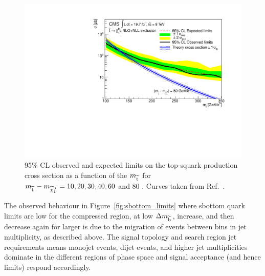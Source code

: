 \begin{figure}[!Hhtb]
\begin{center}
  \includegraphics[scale=0.39]{Figures/sus13009/limits//Limit80.pdf}
  \caption{95\% CL observed and expected limits on the top-squark production cross section as a function of the $m_{\widetilde{{\rm t}}\,}$ for $m_{\widetilde{{\rm t}}\,} - m_{\widetilde{\chi}^{0}_{1}\,} = 10, 20, 30, 40, 60$ and 80 \GeV. Curves taken from Ref.~\cite{sus13009}.}
  \label{fig:stop_limits}
  \end{center}
\end{figure}

The observed behaviour in Figure~\ref{fig:sbottom_limits} where sbottom quark limits are low for the compressed region, at low $\Delta m_{\widetilde{{\rm b}}\,}$, increase, and then decrease again for larger \dmsbot is due to the migration of events between bins in jet multiplicity, as described above. 
The signal topology and search region jet requirements means monojet events, dijet events, and higher jet multiplicities dominate in the different regions of phase space and signal acceptance (and hence limits) respond accordingly. 


